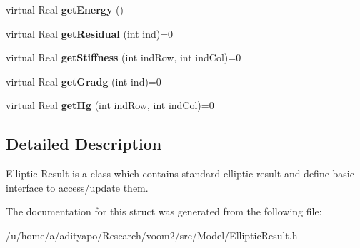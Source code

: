 \begin{DoxyCompactItemize}
\item 
\hypertarget{structvoom_1_1_elliptic_result_aefec9b543f8f5f93f5227a4f4155eb4b}{
virtual Real {\bfseries getEnergy} ()}
\label{structvoom_1_1_elliptic_result_aefec9b543f8f5f93f5227a4f4155eb4b}

\item 
\hypertarget{structvoom_1_1_elliptic_result_a9e66fe4e4c59393074ffa5c62971e494}{
virtual Real {\bfseries getResidual} (int ind)=0}
\label{structvoom_1_1_elliptic_result_a9e66fe4e4c59393074ffa5c62971e494}

\item 
\hypertarget{structvoom_1_1_elliptic_result_a550064e0b125ccf044e50b434224ea64}{
virtual Real {\bfseries getStiffness} (int indRow, int indCol)=0}
\label{structvoom_1_1_elliptic_result_a550064e0b125ccf044e50b434224ea64}

\item 
\hypertarget{structvoom_1_1_elliptic_result_a01fa418b925834e4c736368320930e02}{
virtual Real {\bfseries getGradg} (int ind)=0}
\label{structvoom_1_1_elliptic_result_a01fa418b925834e4c736368320930e02}

\item 
\hypertarget{structvoom_1_1_elliptic_result_ab1a31fbdf0d66a183c6dad36a48efa12}{
virtual Real {\bfseries getHg} (int indRow, int indCol)=0}
\label{structvoom_1_1_elliptic_result_ab1a31fbdf0d66a183c6dad36a48efa12}

\end{DoxyCompactItemize}


\subsection{Detailed Description}
Elliptic Result is a class which contains standard elliptic result and define basic interface to access/update them. 

The documentation for this struct was generated from the following file:\begin{DoxyCompactItemize}
\item 
/u/home/a/adityapo/Research/voom2/src/Model/EllipticResult.h\end{DoxyCompactItemize}

